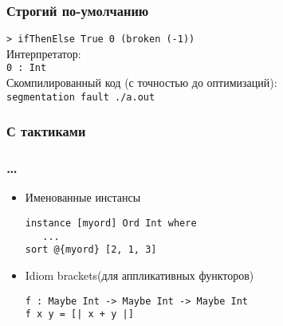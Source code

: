 \begin{frame}[fragile]
   \frametitle{Строгий по-умолчанию}
   
   \texttt{> ifThenElse True 0 (broken (-1))}\\\vspace{0.5em}
   Интерпретатор:\\
   \texttt{0 : Int}\\\vspace{0.5em}
   Скомпилированный код (с точностью до оптимизаций):\\
   \texttt{segmentation fault ./a.out}
\end{frame}

\begin{frame}[fragile]
   \frametitle{С тактиками}
   
\end{frame}

\begin{frame}[fragile]
   \frametitle{\dots}
   \begin{itemize}
   \item Именованные инстансы
         \begin{lstlisting}
instance [myord] Ord Int where
   ...
sort @{myord} [2, 1, 3]
         \end{lstlisting}
   \item Idiom brackets(для аппликативных функторов)
         \begin{lstlisting}
f : Maybe Int -> Maybe Int -> Maybe Int
f x y = [| x + y |]
         \end{lstlisting}
   \end{itemize}
\end{frame}

